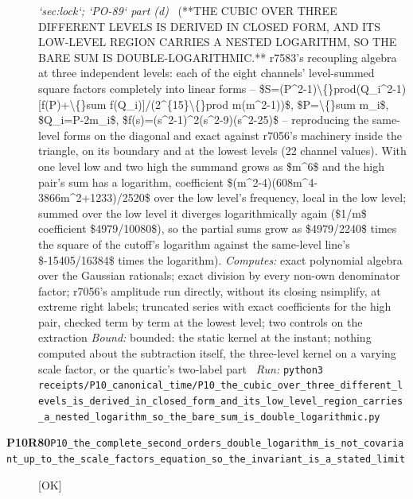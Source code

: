 \begin{description}
\textit{`sec:lock`; `PO-89` part (d)} \ (**THE CUBIC OVER THREE DIFFERENT LEVELS IS DERIVED IN CLOSED FORM, AND ITS LOW-LEVEL REGION CARRIES A NESTED LOGARITHM, SO THE BARE SUM IS DOUBLE-LOGARITHMIC.** r7583's recoupling algebra at three independent levels: each of the eight channels' level-summed square factors completely into linear forms -- \$S=(P\textasciicircum{}2-1)\textbackslash\{\}prod(Q\_i\textasciicircum{}2-1)[f(P)+\textbackslash\{\}sum f(Q\_i)]/(2\textasciicircum{}\{15\}\textbackslash\{\}prod m(m\textasciicircum{}2-1))\$, \$P=\textbackslash\{\}sum m\_i\$, \$Q\_i=P-2m\_i\$, \$f(s)=(s\textasciicircum{}2-1)\textasciicircum{}2(s\textasciicircum{}2-9)(s\textasciicircum{}2-25)\$ -- reproducing the same-level forms on the diagonal and exact against r7056's machinery inside the triangle, on its boundary and at the lowest levels (22 channel values). With one level low and two high the summand grows as \$m\textasciicircum{}6\$ and the high pair's sum has a logarithm, coefficient \$(m\textasciicircum{}2-4)(608m\textasciicircum{}4-3866m\textasciicircum{}2+1233)/2520\$ over the low level's frequency, local in the low level; summed over the low level it diverges logarithmically again (\$1/m\$ coefficient \$4979/10080\$), so the partial sums grow as \$4979/2240\$ times the square of the cutoff's logarithm against the same-level line's \$-15405/16384\$ times the logarithm). 
\emph{Computes:} exact polynomial algebra over the Gaussian rationals; exact division by every non-own denominator factor; r7056's amplitude run directly, without its closing nsimplify, at extreme right labels; truncated series with exact coefficients for the high pair, checked term by term at the lowest level; two controls on the extraction
 \emph{Bound:} bounded: the static kernel at the instant; nothing computed about the subtraction itself, the three-level kernel on a varying scale factor, or the quartic's two-label part
\ \emph{Run:} \texttt{python3 receipts/P10\_canonical\_time/P10\_the\_cubic\_over\_three\_different\_levels\_is\_derived\_in\_closed\_form\_and\_its\_low\_level\_region\_carries\_a\_nested\_logarithm\_so\_the\_bare\_sum\_is\_double\_logarithmic.py}
\item[\rcptlabel{P10_the_complete_second_orders_double_logarithm_is_not_covariant_up_to_the_scale_factors_equation_so_the_invariant_is_a_stated_limit}{P10R80}\textbf{P10R80}\quad\texttt{P10\_the\_complete\_second\_orders\_double\_logarithm\_is\_not\_covariant\_up\_to\_the\_scale\_factors\_equation\_so\_the\_invariant\_is\_a\_stated\_limit}]\hfill\textsf{[OK]}\\

\end{description}
